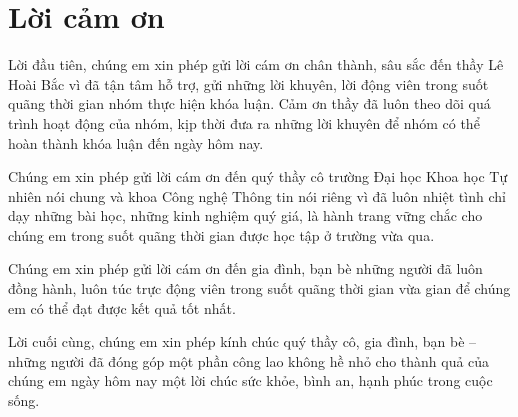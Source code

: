 \chapter*{Lời cảm ơn}
\label{thanks}

\noindent Lời đầu tiên, chúng em xin phép gửi lời cám ơn chân thành, sâu sắc đến thầy Lê Hoài Bắc vì đã tận tâm hỗ trợ, gửi những lời khuyên, lời động viên trong suốt quãng thời gian nhóm thực hiện khóa luận. Cảm ơn thầy đã luôn theo dõi quá trình hoạt động của nhóm, kịp thời đưa ra những lời khuyên để nhóm có thể hoàn thành khóa luận đến ngày hôm nay.

Chúng em xin phép gửi lời cám ơn đến quý thầy cô trường Đại học Khoa học Tự nhiên nói chung và khoa Công nghệ Thông tin nói riêng vì đã luôn nhiệt tình chỉ dạy những bài học, những kinh nghiệm quý giá, là hành trang vững chắc cho chúng em trong suốt quãng thời gian được học tập ở trường vừa qua.

Chúng em xin phép gửi lời cám ơn đến gia đình, bạn bè những người đã luôn đồng hành, luôn túc trực động viên trong suốt quãng thời gian vừa gian để chúng em có thể đạt được kết quả tốt nhất.

Lời cuối cùng, chúng em xin phép kính chúc quý thầy cô, gia đình, bạn bè -- những người đã đóng góp một phần công lao không hề nhỏ cho thành quả của chúng em ngày hôm nay một lời chúc sức khỏe, bình an, hạnh phúc trong cuộc sống.